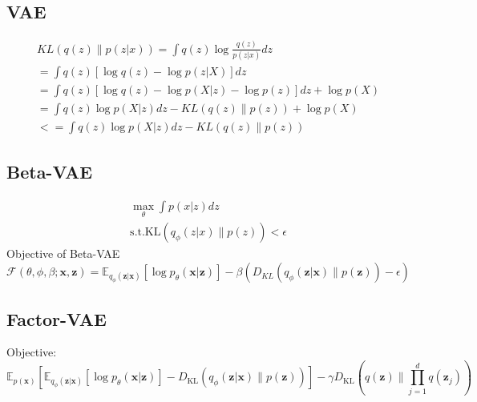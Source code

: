 \documentclass{article}
\begin{document}
\subsection{VAE}
\begin{equation}
\begin{array}{l}{K L(q(z) \| p(z | x))=\int q(z) \log \frac{q(z)}{p(z | x)} d z} \\ {=\int q(z)[\log q(z)-\log p(z | X)] d z} \\ {=\int q(z)[\log q(z)-\log p(X | z)-\log p(z)] d z+\log p(X)} \\ {=\int q(z) \log p(X | z) d z-K L(q(z) \| p(z))+\log p(X)} \\ {<=\int q(z) \log p(X | z) d z-K L(q(z) \| p(z))}\end{array}
\end{equation}
\subsection{Beta-VAE}
\begin{equation}
\begin{array}{l}{\max _{\theta} \int p(x | z) d z} \\ {\text {s.t.KL}\left(q_{\phi}(z | x) \| p(z)\right)<\epsilon}\end{array}
\end{equation}
Objective of Beta-VAE
\begin{equation}
\mathcal{F}(\theta, \phi, \beta ; \mathbf{x}, \mathbf{z})=\mathbb{E}_{q_{\phi}(\mathbf{z} | \mathbf{x})}\left[\log p_{\theta}(\mathbf{x} | \mathbf{z})\right]-\beta\left(D_{K L}\left(q_{\phi}(\mathbf{z} | \mathbf{x}) \| p(\mathbf{z})\right)-\epsilon\right)
\end{equation}
\subsection{Factor-VAE}
Objective:
\begin{equation}
\mathbb{E}_{p(\mathbf{x})}\left[\mathbb{E}_{q_{\phi}(\mathbf{z} | \mathbf{x})}\left[\log p_{\theta}(\mathbf{x} | \mathbf{z})\right]-D_{\mathrm{KL}}\left(q_{\phi}(\mathbf{z} | \mathbf{x}) \| p(\mathbf{z})\right)\right]-\gamma D_{\mathrm{KL}}\left(q(\mathbf{z}) \| \prod_{j=1}^{d} q\left(\mathbf{z}_{j}\right)\right)
\end{equation}
\end{document}
